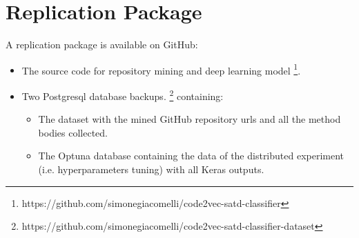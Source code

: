 \section{Replication Package}
A replication package is available on GitHub:
\begin{itemize}
    \item The source code for repository mining and deep learning model \footnote{https://github.com/simonegiacomelli/code2vec-satd-classifier}. 
    \item Two Postgresql database backups. \footnote{https://github.com/simonegiacomelli/code2vec-satd-classifier-dataset } containing:
    \begin{itemize}
\item The dataset with the mined GitHub repository urls and all the method bodies collected.
\item The Optuna database containing the data of the distributed experiment (i.e. hyperparameters tuning) with all Keras outputs. 
\end{itemize}
\end{itemize}
